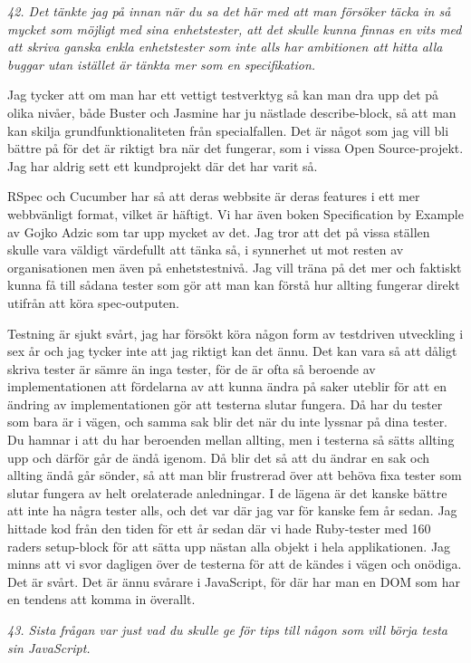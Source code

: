 \documentclass[11pt]{article}
\begin{document}
\emph{42. Det tänkte jag på innan när du sa det här med att man försöker täcka in så mycket som möjligt med sina enhetstester, att det skulle kunna finnas en vits med att skriva ganska enkla enhetstester som inte alls har ambitionen att hitta alla buggar utan istället är tänkta mer som en specifikation.}

Jag tycker att om man har ett vettigt testverktyg så kan man dra upp det på olika nivåer, både Buster och Jasmine har ju nästlade describe-block, så att man kan skilja grundfunktionaliteten från specialfallen. Det är något som jag vill bli bättre på för det är riktigt bra när det fungerar, som i vissa Open Source-projekt. Jag har aldrig sett ett kundprojekt där det har varit så.

RSpec och Cucumber har så att deras webbsite är deras features i ett mer webbvänligt format, vilket är häftigt. Vi har även boken Specification by Example av Gojko Adzic som tar upp mycket av det. Jag tror att det på vissa ställen skulle vara väldigt värdefullt att tänka så, i synnerhet ut mot resten av organisationen men även på enhetstestnivå. Jag vill träna på det mer och faktiskt kunna få till sådana tester som gör att man kan förstå hur allting fungerar direkt utifrån att köra spec-outputen.

Testning är sjukt svårt, jag har försökt köra någon form av testdriven utveckling i sex år och jag tycker inte att jag riktigt kan det ännu. Det kan vara så att dåligt skriva tester är sämre än inga tester, för de är ofta så beroende av implementationen att fördelarna av att kunna ändra på saker uteblir för att en ändring av implementationen gör att testerna slutar fungera. Då har du tester som bara är i vägen, och samma sak blir det när du inte lyssnar på dina tester. Du hamnar i att du har beroenden mellan allting, men i testerna så sätts allting upp och därför går de ändå igenom. Då blir det så att du ändrar en sak och allting ändå går sönder, så att man blir frustrerad över att behöva fixa tester som slutar fungera av helt orelaterade anledningar. I de lägena är det kanske bättre att inte ha några tester alls, och det var där jag var för kanske fem år sedan. Jag hittade kod från den tiden för ett år sedan där vi hade Ruby-tester med 160 raders setup-block för att sätta upp nästan alla objekt i hela applikationen. Jag minns att vi svor dagligen över de testerna för att de kändes i vägen och onödiga. Det är svårt. Det är ännu svårare i JavaScript, för där har man en DOM som har en tendens att komma in överallt.

\emph{43. Sista frågan var just vad du skulle ge för tips till någon som vill börja testa sin JavaScript.}
\end{document}
